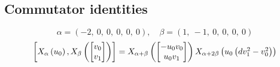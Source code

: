 \documentclass[11pt]{article}
\theoremstyle{definition}
\begin{document}
\subsection{Commutator identities}

\providecommand{\scaletoalign}[2]{%
  \sbox0{$#2$}%
  \ifdim\wd0>#1\relax 
    \resizebox{#1}{!}{\usebox0}%
  \else 
    \usebox0%
  \fi 
}
\[
\alpha = \left( -2, \  0, \  0, \  0, \  0, \  0\right), \quad \beta = \left( 1, \  -1, \  0, \  0, \  0, \  0\right)
\]
\[
\scaletoalign{\textwidth}{\left[ X_{\alpha}\left(u_{0}\right), X_{\beta}\left(\left[\begin{matrix}v_{0}\\v_{1}\end{matrix}\right]\right) \right] = X_{\alpha + \beta}\left(\left[\begin{matrix}- u_{0} v_{0}\\u_{0} v_{1}\end{matrix}\right]\right) X_{\alpha + 2\beta}\left(u_{0} \left(d v_{1}^{2} - v_{0}^{2}\right)\right)}
\]
\end{document}
